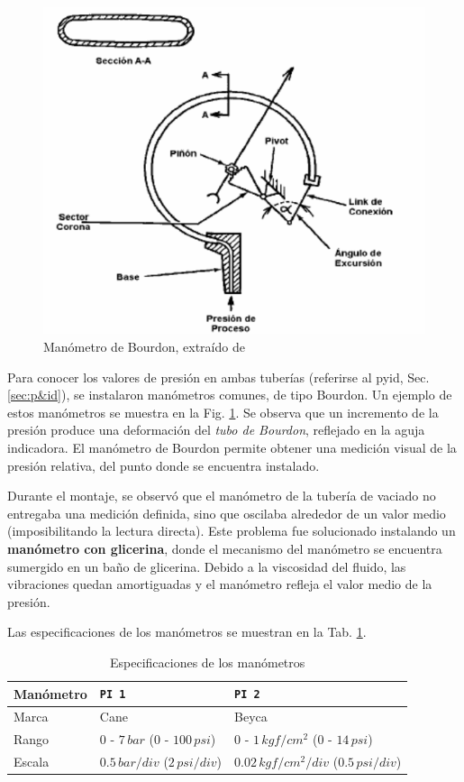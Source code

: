 \begin{figure}[t]
 \centering
\includegraphics[width=.59\textwidth]
{Cap2-DisenoEnsamblado/images/manomBourdon.png}
 \caption{Manómetro de Bourdon, extraído de \cite{bib:ApuntesPuglesiPlacaOrif}}
 \label{fig:manometroBourdon}
\end{figure}

Para conocer los valores de presión en ambas tuberías
(referirse al \gls{pyid}, Sec. \ref{sec:p&id}),
se instalaron manómetros comunes, de tipo Bourdon.
Un ejemplo de estos manómetros se muestra en la Fig. \ref{fig:manometroBourdon}.
Se observa que un incremento de la presión produce una deformación
del \emph{tubo de Bourdon}, reflejado en la aguja indicadora.
El manómetro de Bourdon permite obtener una medición visual de la
presión relativa, del punto donde se encuentra instalado.



Durante el montaje, se observó que el manómetro de la tubería de vaciado
no entregaba una medición definida, sino que oscilaba alrededor de un
valor medio (imposibilitando la lectura directa).
Este problema fue solucionado instalando un \textbf{manómetro con glicerina},
donde el mecanismo del manómetro se encuentra sumergido en un baño de glicerina.
Debido a la viscosidad del fluido, las vibraciones quedan amortiguadas
y el manómetro refleja el valor medio de la presión.

Las especificaciones de los manómetros se muestran en la Tab.
\ref{tab:EspManoms}.

\begin{table}[h]
\renewcommand{\arraystretch}{1.3}
\centering
\begin{tabular}{|l|l|l|}
\hline
Manómetro & \texttt{PI 1}& \texttt{PI 2}\\
\hline
Marca & Cane & Beyca \\
Rango & $0$ - $7\,bar$ ($0$ - $100\,psi$) & $0$ - $1\,kgf/cm^2$ ($0$
- $14\,psi$) \\
Escala & $0.5\,bar/div$ ($2\,psi/div$) & $0.02\,kgf/cm^2/div$
($0.5\,psi/div$)\\
\hline
\end{tabular}
\caption{Especificaciones de los manómetros}
\label{tab:EspManoms}
\end{table}

